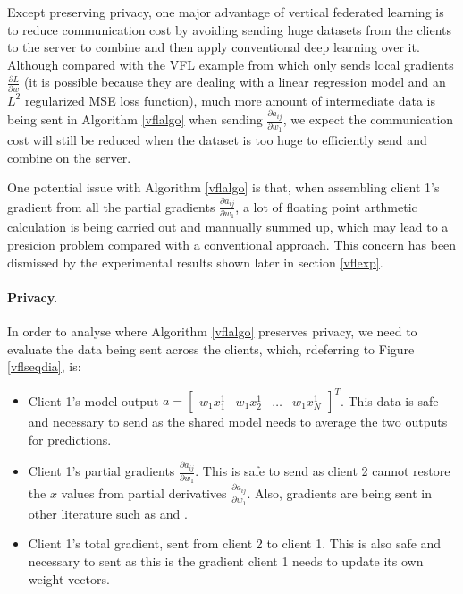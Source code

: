 \documentclass{article}
\begin{document}
Except preserving privacy, one major advantage of vertical federated learning is to reduce communication cost by avoiding sending huge datasets from the clients to the server to combine and then apply conventional deep learning over it. Although compared with the VFL example from \cite{yang2019federated} which only sends local gradients $\frac{\partial L}{\partial w}$ (it is possible because they are dealing with a linear regression model and an $L^2$ regularized MSE loss function), much more amount of intermediate data is being sent in Algorithm \ref{vflalgo} when sending $\frac{\partial a_{ij}}{\partial w_1}$, we expect the communication cost will still be reduced when the dataset is too huge to efficiently send and combine on the server.

One potential issue with Algorithm \ref{vflalgo} is that, when assembling client 1's gradient from all the partial gradients $\frac{\partial a_{ij}}{\partial w_1}$, a lot of floating point arthmetic calculation is being carried out and mannually summed up, which may lead to a presicion problem compared with a conventional approach. This concern has been dismissed by the experimental results shown later in section \ref{vflexp}.

\paragraph{Privacy.} In order to analyse where Algorithm \ref{vflalgo} preserves privacy, we need to evaluate the data being sent across the clients, which, rdeferring to Figure \ref{vflseqdia}, is:
\begin{itemize}
  \item Client 1's model output $a=\begin{bmatrix} w_1x_1^1& w_1x_2^1& \ldots &w_1x_N^1 \end{bmatrix}^T$. This data is safe and necessary to send as the shared model needs to average the two outputs for predictions.
  \item Client 1's partial gradients $\frac{\partial a_{ij}}{\partial w_1}$. This is safe to send as client 2 cannot restore the $x$ values from partial derivatives $\frac{\partial a_{ij}}{\partial w_1}$. Also, gradients are being sent in other literature such as \cite{yang2019federated} and \cite{hardy2017private}.
  \item Client 1's total gradient, sent from client 2 to client 1. This is also safe and necessary to sent as this is the gradient client 1 needs to update its own weight vectors.
\end{itemize}
\end{document}
